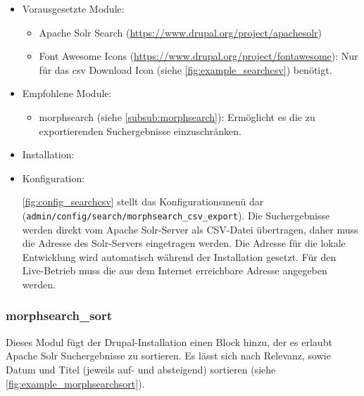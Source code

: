 \begin{itemize}[parsep=0pt, itemsep=5.0pt plus 2.0pt minus 1.0pt, leftmargin=*]
	\item Vorausgesetzte Module:
	
	\begin{itemize}
		\item 	Apache Solr Search (\url{https://www.drupal.org/project/apachesolr})
		
		\item Font Awesome Icons (\url{https://www.drupal.org/project/fontawesome}): Nur für das csv Download Icon (siehe \cref{fig:example_searchcsv}) benötigt.
	\end{itemize}
	
	
	\item Empfohlene Module:
	
	\begin{itemize}
		\item morphsearch (siehe \cref{subsub:morphsearch}): Ermöglicht es die zu exportierenden Suchergebnisse einzuschränken.
	\end{itemize}
	
	
	\item Installation: \standardinstall
	
	\item Konfiguration:
	
	\cref{fig:config_searchcsv} stellt das Konfigurationsmenü dar (\lstinline|admin/config/search/morphsearch_csv_export|). Die Suchergebnisse werden direkt vom Apache Solr-Server als CSV-Datei übertragen, daher muss die Adresse des Solr-Servers eingetragen werden. Die Adresse für die lokale Entwicklung wird automatisch während der Installation gesetzt. Für den Live-Betrieb muss die aus dem Internet erreichbare Adresse angegeben werden.

\end{itemize}






\newpage
\subsubsection{morphsearch\_sort}\label{subsub:morphsearchsort}
Dieses Modul fügt der Drupal-Installation einen Block hinzu, der es erlaubt Apache Solr Suchergebnisse zu sortieren. Es lässt sich nach Relevanz, sowie Datum und Titel (jeweils auf- und absteigend) sortieren (siehe \cref{fig:example_morphsearchsort}).


